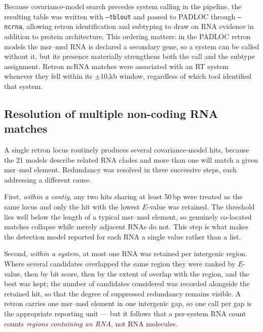 
Because covariance-model search precedes system calling in the pipeline, the resulting table was written with \texttt{--tblout} and passed to PADLOC through \texttt{--ncrna}, allowing retron identification and subtyping to draw on RNA evidence in addition to protein architecture. This ordering
matters: in the PADLOC retron models the msr--msd RNA is declared a secondary gene,
so a system can be called without it, but its presence materially strengthens both
the call and the subtype assignment. Retron ncRNA matches were associated with an RT system whenever they fell within its $\pm$10,kb window, regardless of which tool identified that system.


\subsection{Resolution of multiple non-coding RNA matches}
\label{sec:ncrna-multiple}


A single retron locus routinely produces several covariance-model hits, because the
21 models describe related RNA clades and more than one will match a given msr--msd
element. Redundancy was resolved in three successive steps, each addressing a
different cause.

First, \emph{within a contig}, any two hits sharing at least 50\,bp were treated as
the same locus and only the hit with the lowest $E$-value was retained. The threshold
lies well below the length of a typical msr--msd element, so genuinely co-located
matches collapse while merely adjacent RNAs do not. This step is what makes the
detection model reported for each RNA a single value rather than a list.

Second, \emph{within a system}, at most one RNA was retained per intergenic region.
Where several candidates overlapped the same region they were ranked by $E$-value,
then by bit score, then by the extent of overlap with the region, and the best was
kept; the number of candidates considered was recorded alongside the retained hit, so
that the degree of suppressed redundancy remains visible. A retron carries one
msr--msd element in one intergenic gap, so one call per gap is the appropriate
reporting unit --- but it follows that a per-system RNA count counts \emph{regions
containing an RNA}, not RNA molecules.

